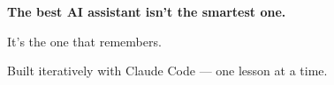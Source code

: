 \documentclass[aspectratio=169,11pt]{beamer}
\begin{document}
\begin{frame}{}

\centering
\vfill

{\Large\bfseries\textcolor{cPrimary}{The best AI assistant isn't the smartest one.}}

\bigskip

{\Large\textcolor{cAccent}{It's the one that remembers.}}

\vfill

\small\textcolor{cGray}{Built iteratively with Claude Code --- one lesson at a time.}

\vfill

\end{frame}
\end{document}
